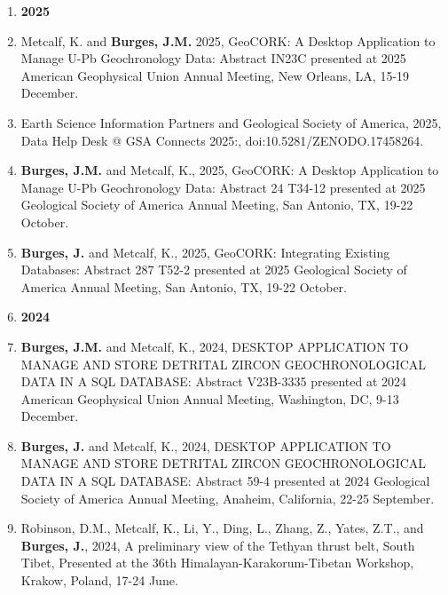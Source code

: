 \documentclass{res} %
\begin{document}
\begin{resume}
\begin{enumerate}
\item[] \hspace*{-24pt}\textbf{\large 2025}

\item Metcalf, K. and \textbf{Burges, J.M.} 2025, GeoCORK: A Desktop Application to Manage U-Pb Geochronology Data: Abstract IN23C presented at 2025 American Geophysical Union Annual Meeting, New Orleans, LA, 15-19 December.

\item Earth Science Information Partners and Geological Society of America, 2025, Data Help Desk @ GSA Connects 2025:, doi:10.5281/ZENODO.17458264.

\item \textbf{Burges, J.M.} and Metcalf, K., 2025, GeoCORK: A Desktop Application to Manage U-Pb Geochronology Data:  Abstract 24 T34-12 presented at 2025 Geological Society of America Annual Meeting, San Antonio, TX, 19-22 October.

\item \textbf{Burges, J.} and Metcalf, K., 2025, GeoCORK: Integrating Existing Databases:  Abstract 287 T52-2 presented at 2025 Geological Society of America Annual Meeting, San Antonio, TX, 19-22 October.

\item[] \hspace*{-24pt}\textbf{\large 2024}

\item \textbf{Burges, J.M.} and Metcalf, K., 2024, DESKTOP APPLICATION TO MANAGE AND STORE DETRITAL ZIRCON GEOCHRONOLOGICAL DATA IN A SQL DATABASE: Abstract V23B-3335 presented at 2024 American  Geophysical Union Annual Meeting, Washington, DC, 9-13 December.

\item \textbf{Burges, J.} and Metcalf, K., 2024, DESKTOP APPLICATION TO MANAGE AND STORE DETRITAL ZIRCON GEOCHRONOLOGICAL DATA IN A SQL DATABASE: Abstract 59-4 presented at 2024 Geological Society of America Annual Meeting, Anaheim, California, 22-25 September.

\item Robinson, D.M., Metcalf, K., Li, Y., Ding, L., Zhang, Z., Yates, Z.T., and \textbf{Burges, J.}, 2024, A preliminary view of the Tethyan thrust belt, South Tibet, Presented at the 36th Himalayan-Karakorum-Tibetan Workshop, Krakow, Poland, 17-24 June.


\end{enumerate}
\end{resume}
\end{document}
